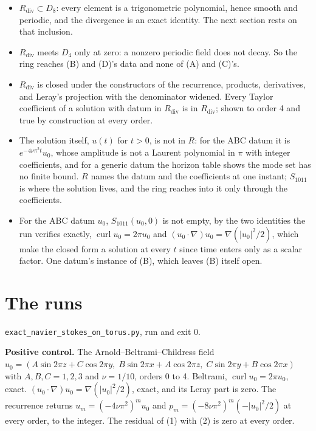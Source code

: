 \begin{itemize}
\item $R_{\mathrm{div}} \subset D_8$: every element is a trigonometric polynomial, hence smooth and
  periodic, and the divergence is an exact identity. The next section rests on that
  inclusion.
\item $R_{\mathrm{div}}$ meets $D_4$ only at zero: a nonzero periodic field does not decay. So the
  ring reaches (B) and (D)'s data and none of (A) and (C)'s.
\item $R_{\mathrm{div}}$ is closed under the constructors of the recurrence, products, derivatives,
  and Leray's projection with the denominator widened. Every Taylor coefficient of a solution with
  datum in $R_{\mathrm{div}}$ is in $R_{\mathrm{div}}$; shown to order 4 and true by construction at
  every order.
\item The solution itself, $u(t)$ for $t>0$, is not in $R$: for the ABC datum it is
  $e^{-4\nu\pi^2 t}u_0$, whose amplitude is not a Laurent polynomial in $\pi$ with integer
  coefficients, and for a generic datum the horizon table shows the mode set has no finite bound. $R$
  names the datum and the coefficients at one instant; $S_{1011}$ is where the solution lives, and the
  ring reaches into it only through the coefficients.
\item For the ABC datum $u_0$, $S_{1011}(u_0,0)$ is not empty, by the two identities the run verifies
  exactly, $\operatorname{curl}u_0 = 2\pi u_0$ and $(u_0\cdot\nabla)u_0 = \nabla(|u_0|^2/2)$, which
  make the closed form a solution at every $t$ since time enters only as a scalar factor. One datum's
  instance of (B), which leaves (B) itself open.
\end{itemize}

\section{The runs}

\texttt{exact\_navier\_stokes\_on\_torus.py}, run and exit 0.

\textbf{Positive control.} The Arnold--Beltrami--Childress field
$u_0 = (A\sin 2\pi z + C\cos 2\pi y,\; B\sin 2\pi x + A\cos 2\pi z,\; C\sin 2\pi y + B\cos 2\pi x)$
with $A,B,C = 1,2,3$ and $\nu = 1/10$, orders 0 to 4. Beltrami, $\operatorname{curl}u_0 = 2\pi u_0$,
exact. $(u_0\cdot\nabla)u_0 = \nabla(|u_0|^2/2)$, exact, and its Leray part is zero. The recurrence
returns $u_m = (-4\nu\pi^2)^m u_0$ and $p_m = (-8\nu\pi^2)^m(-|u_0|^2/2)$ at every order, to the
integer. The residual of (1) with (2) is zero at every order.

